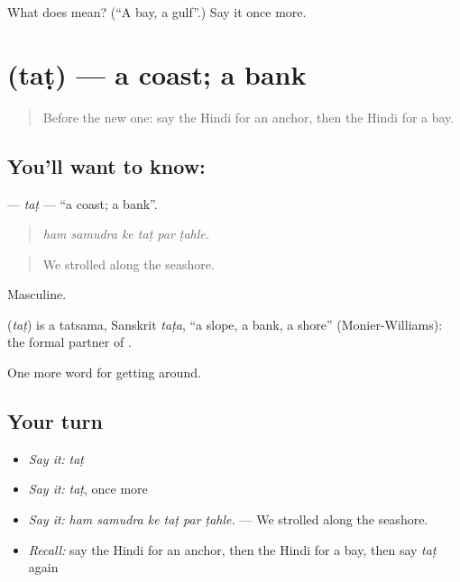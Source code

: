 \begin{tcolorbox}[breakable,colback=teal!4,colframe=teal!35!black,title={Before you move on}]
What does  mean? (\textquotedblleft{}A bay, a gulf\textquotedblright{}.) Say it once more.
\end{tcolorbox}
\section[\texorpdfstring{\hi{तट} (taṭ)}{तट (taṭ)}]{ (taṭ) — a coast; a bank}

\label{lesson:HI-C444-tat}



\begin{quote}
Before the new one: say the Hindi for an anchor, then the Hindi for a bay.
\end{quote}

\subsection*{You'll want to know: }
\textbf{} — \emph{taṭ} — \textquotedblleft{}a coast; a bank\textquotedblright{}.

\begin{quote}
     
\end{quote}

\begin{quote}
\emph{ham samudra ke taṭ par ṭahle.}
\end{quote}

\begin{quote}
We strolled along the seashore.
\end{quote}

Masculine.

\begin{cousinweb}
\textbf{} (\emph{taṭ}) is a tatsama, Sanskrit \emph{taṭa}, \textquotedblleft{}a slope, a bank, a shore\textquotedblright{} (Monier-Williams): the formal partner of .
\end{cousinweb}

\begin{grammarlens}[title={What you've built}]
One more word for getting around.
\end{grammarlens}

\subsection*{Your turn}
\begin{itemize}
\raggedright
  \item \emph{Say it:} \emph{taṭ}
  \item \emph{Say it:} \emph{taṭ}, once more
  \item \emph{Say it:} \emph{ham samudra ke taṭ par ṭahle.} — We strolled along the seashore.
  \item \emph{Recall:} say the Hindi for an anchor, then the Hindi for a bay, then say \emph{taṭ} again
\end{itemize}

